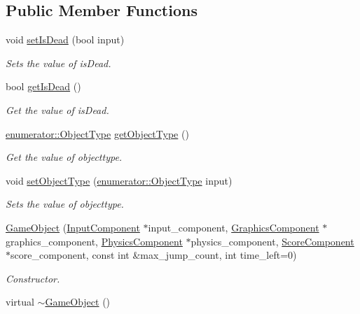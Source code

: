 \subsection*{Public Member Functions}
\begin{DoxyCompactItemize}
\item 
void \hyperlink{classGameObject_a461843e85bd8bfd205016e4adfd32489}{set\-Is\-Dead} (bool input)
\begin{DoxyCompactList}\small\item\em Sets the value of is\-Dead. \end{DoxyCompactList}\item 
bool \hyperlink{classGameObject_ab517f9caa5b662ec7ee8a8ead945ec8c}{get\-Is\-Dead} ()
\begin{DoxyCompactList}\small\item\em Get the value of is\-Dead. \end{DoxyCompactList}\item 
\hyperlink{namespaceenumerator_a74b6f7a3aada6983503ce0f88ee90b29}{enumerator\-::\-Object\-Type} \hyperlink{classGameObject_a5f4df627b722ca069bb497b83cb2cd47}{get\-Object\-Type} ()
\begin{DoxyCompactList}\small\item\em Get the value of objecttype. \end{DoxyCompactList}\item 
void \hyperlink{classGameObject_a20cc88a6d715503efcd3746d6aceb027}{set\-Object\-Type} (\hyperlink{namespaceenumerator_a74b6f7a3aada6983503ce0f88ee90b29}{enumerator\-::\-Object\-Type} input)
\begin{DoxyCompactList}\small\item\em Sets the value of objecttype. \end{DoxyCompactList}\item 
\hyperlink{classGameObject_a3a6bd333e736ddabb177574217f6a93b}{Game\-Object} (\hyperlink{classInputComponent}{Input\-Component} $\ast$input\-\_\-component, \hyperlink{classGraphicsComponent}{Graphics\-Component} $\ast$graphics\-\_\-component, \hyperlink{classPhysicsComponent}{Physics\-Component} $\ast$physics\-\_\-component, \hyperlink{classScoreComponent}{Score\-Component} $\ast$score\-\_\-component, const int \&max\-\_\-jump\-\_\-count, int time\-\_\-left=0)
\begin{DoxyCompactList}\small\item\em Constructor. \end{DoxyCompactList}\item 
\hypertarget{classGameObject_a224d4f6d9dd75c8a6f9d022eaf586fd9}{virtual \hyperlink{classGameObject_a224d4f6d9dd75c8a6f9d022eaf586fd9}{$\sim$\-Game\-Object} ()}\label{classGameObject_a224d4f6d9dd75c8a6f9d022eaf586fd9}


\end{DoxyCompactItemize}
